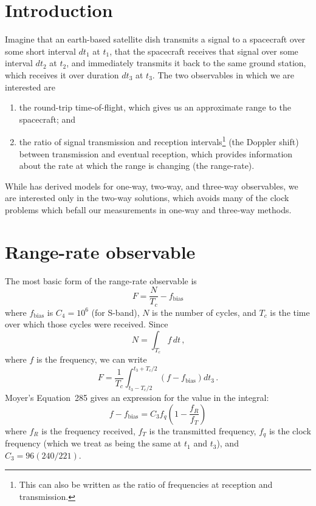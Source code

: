 \documentclass[12pt]{article}
\begin{document}
\maketitle

\section{Introduction}
Imagine that an earth-based satellite dish transmits a signal to a spacecraft over some short interval $dt_1$ at $t_1$, that the spacecraft receives that signal over some interval $dt_2$ at $t_2$, and immediately transmits it back to the same ground station, which receives it over duration $dt_3$ at $t_3$. The two observables in which we are interested are 
\begin{enumerate}
\item the round-trip time-of-flight, which gives us an approximate range to the spacecraft; and
\item the ratio of signal transmission and reception intervals\footnote{This can also be written as the ratio of frequencies at reception and transmission.} (the Doppler shift) between transmission and eventual reception, which provides information about the rate at which the range is changing (the range-rate).
\end{enumerate}

While \citet{Moyer1971} has derived models for one-way, two-way, and three-way observables, we are interested only in the two-way solutions, which avoids many of the clock problems which befall our measurements in one-way and three-way methods. 

\section{Range-rate observable}
The most basic form of the range-rate observable is
\begin{equation}
F = \frac{N}{T_c} - f_\text{bias}
\end{equation}
where $f_\text{bias}$ is $C_4=10^6$ (for S-band), $N$ is the number of cycles, and $T_c$ is the time over which those cycles were received. Since
\begin{equation}
N = \int_{T_c} f\,dt\,\text{,}
\end{equation}
where $f$ is the frequency, we can write
\begin{equation}
F = \frac{1}{T_c}\int_{t_3 - T_c/2}^{t_3 + T_c/2} (f - f_\text{bias}) dt_3\,\text{.}
\end{equation}
Moyer's Equation~285 gives an expression for the value in the integral:
\begin{equation}
f - f_\text{bias} = C_3 f_q \left(1 - \frac{f_R}{f_T}\right)
\end{equation}
where $f_R$ is the frequency received, $f_T$ is the transmitted frequency, $f_q$ is the clock frequency (which we treat as being the same at $t_1$ and $t_3$), and $C_3=96(240/221)$. 
\end{document}
